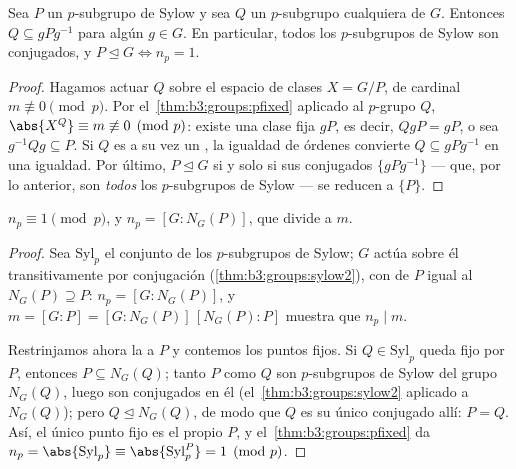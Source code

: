 \begin{theorem}\label{thm:b3:groups:sylow2}
Sea $P$ un $p$-subgrupo de Sylow y sea $Q$ un $p$-subgrupo cualquiera de
$G$. Entonces $Q \subseteq gPg^{-1}$ para algún $g \in G$. En
particular, todos los $p$-subgrupos de Sylow son conjugados, y
$P \trianglelefteq G \iff
n_p = 1$.
\end{theorem}

\begin{proof}
Hagamos actuar $Q$ sobre el espacio de clases $X = G/P$, de cardinal $m
\not\equiv 0 \pmod p$. Por el~\cref{thm:b3:groups:pfixed} aplicado al
$p$-grupo $Q$, $\abs{X^Q} \equiv m \not\equiv 0 \pmod p$: existe una
clase fija $gP$, es decir, $QgP = gP$, o sea $g^{-1}Qg \subseteq
P$. Si $Q$ es a su vez un , la igualdad de órdenes convierte $Q \subseteq gPg^{-1}$ en una
igualdad. Por último, $P
\trianglelefteq G$ si y solo si sus conjugados $\{gPg^{-1}\}$ --- que,
por lo anterior, son \emph{todos} los $p$-subgrupos de Sylow --- se
reducen a
$\{P\}$.
\end{proof}

\begin{theorem}\label{thm:b3:groups:sylow3}
$n_p \equiv 1 \pmod p$, y $n_p = [G : N_G(P)]$, que divide a
$m$.
\end{theorem}

\begin{proof}
Sea $\mathrm{Syl}_p$ el conjunto de los $p$-subgrupos de Sylow; $G$
actúa sobre él transitivamente por conjugación
(\cref{thm:b3:groups:sylow2}), con
 de $P$ igual al
 $N_G(P) \supseteq P$:
$n_p = [G :
N_G(P)]$, y $m = [G:P] = [G:N_G(P)]\,[N_G(P):P]$ muestra que $n_p \mid
m$.

Restrinjamos ahora la  a $P$ y
contemos los puntos fijos. Si $Q \in
\mathrm{Syl}_p$ queda fijo por $P$, entonces $P \subseteq N_G(Q)$; tanto
$P$ como $Q$ son $p$-subgrupos de Sylow del grupo $N_G(Q)$, luego son
conjugados en él (el~\cref{thm:b3:groups:sylow2} aplicado a $N_G(Q)$);
pero $Q \trianglelefteq N_G(Q)$, de modo que $Q$ es su único conjugado
allí: $P = Q$. Así, el único punto fijo es el propio $P$, y
el~\cref{thm:b3:groups:pfixed} da $n_p = \abs{\mathrm{Syl}_p}
\equiv \abs{\mathrm{Syl}_p^P} = 1 \pmod p$.
\end{proof}

